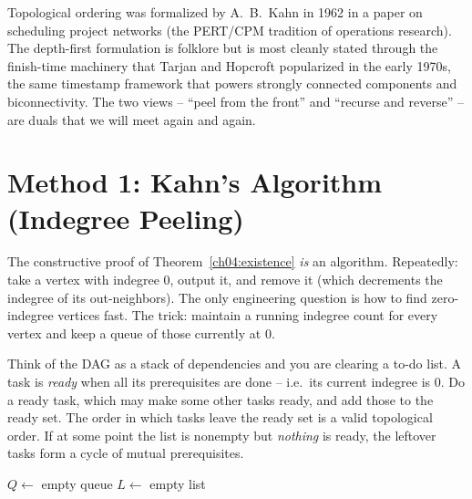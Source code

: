 \begin{historybox}
Topological ordering was formalized by A.~B.~Kahn in 1962 in a paper on scheduling project networks
(the PERT/CPM tradition of operations research). The depth-first formulation is folklore but is most
cleanly stated through the finish-time machinery that Tarjan and Hopcroft popularized in the early
1970s, the same timestamp framework that powers strongly connected components and biconnectivity. The
two views -- ``peel from the front'' and ``recurse and reverse'' -- are duals that we will meet again
and again.
\end{historybox}

\section{Method 1: Kahn's Algorithm (Indegree Peeling)}

The constructive proof of Theorem~\ref{ch04:existence} \emph{is} an algorithm. Repeatedly: take a
vertex with indegree $0$, output it, and remove it (which decrements the indegree of its
out-neighbors). The only engineering question is how to find zero-indegree vertices fast. The trick:
maintain a running indegree count for every vertex and keep a queue of those currently at $0$.

\begin{intuitionbox}
Think of the DAG as a stack of dependencies and you are clearing a to-do list. A task is
\emph{ready} when all its prerequisites are done -- i.e.\ its current indegree is $0$. Do a ready
task, which may make some other tasks ready, and add those to the ready set. The order in which tasks
leave the ready set is a valid topological order. If at some point the list is nonempty but
\emph{nothing} is ready, the leftover tasks form a cycle of mutual prerequisites.
\end{intuitionbox}

\begin{algorithm}[H]
\DontPrintSemicolon
{}
$Q\gets$ empty queue\;
$L\gets$ empty list\;
\caption{\textsc{KahnTopoSort}$(\Gph)$}\label{ch04:kahn-algo}
\end{algorithm}

